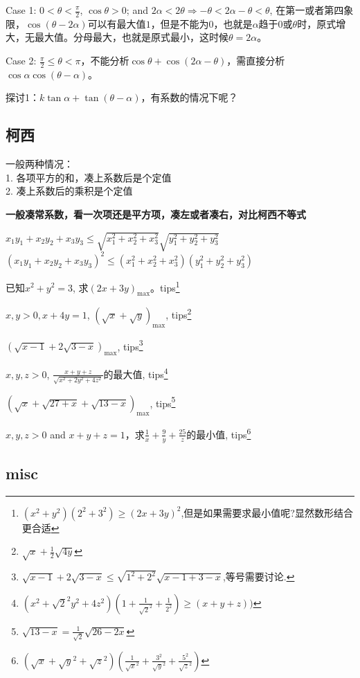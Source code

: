 \documentclass[algebra.tex]{subfiles}
\begin{document}
Case 1: $0<\theta < \frac{\pi}{2}$,\; $\cos\theta>0$; and $2\alpha < 2\theta \Rightarrow -\theta <2\alpha-\theta < \theta$, 在第一或者第四象限，$\cos(\theta-2\alpha)$可以有最大值$1$，但是不能为0，也就是$\alpha$趋于$0$或$\theta$时，原式增大，无最大值。分母最大，也就是原式最小，这时候$\theta=2\alpha$。

Case 2: $\frac{\pi}{2}\le \theta <\pi$，不能分析$\cos\theta+\cos(2\alpha-\theta)$，需直接分析$\cos\alpha\cos(\theta-\alpha)$。

探讨1：$k\tan\alpha+\tan(\theta-\alpha)$，有系数的情况下呢？

\subsection{柯西}
一般两种情况：\\
1. 各项平方的和，凑上系数后是个定值\\
2. 凑上系数后的乘积是个定值

\textbf{一般凑常系数，看一次项还是平方项，凑左或者凑右，对比柯西不等式}

$x_1y_1+x_2y_2+x_3y_3 \le \sqrt{x_1^2+x_2^2+x_3^2} \sqrt{y_1^2+y_2^2+y_3^2}$ \\
$(x_1y_1+x_2y_2+x_3y_3)^2 \le (x_1^2+x_2^2+x_3^2)(y_1^2+y_2^2+y_3^2)$

已知$x^2+y^2=3$, 求$(2x+3y)_{\text{max}}$。tips\footnote{$(x^2+y^2)(2^2+3^2) \ge (2x+3y)^2$,但是如果需要求最小值呢?显然数形结合更合适}

$x,y>0, x+4y=1$, $(\sqrt{x}+\sqrt{y})_{\text{max}}$, tips\footnote{$\sqrt{x}+\frac{1}{2}\sqrt{4y}$}

$(\sqrt{x-1} + 2\sqrt{3-x})_{\text{max}}$, tips\footnote{$\sqrt{x-1} + 2\sqrt{3-x} \le \sqrt{1^2+2^2}\sqrt{x-1+3-x}$,等号需要讨论.}

$x,y,z >0$, $\frac{x+y+z}{\sqrt{x^2+2y^2+4z^2}}$的最大值, tips\footnote{$(x^2+\sqrt{2}^2 y^2+4z^2)(1+\frac{1}{\sqrt{2}^2} +\frac{1}{2^{2}})\ge (x+y+z))$}


$(\sqrt{x}+\sqrt{27+x} +\sqrt{13-x})_{\text{max}}$, tips\footnote{$\sqrt{13-x} = \frac{1}{\sqrt{2}}\sqrt{26-2x}$}

$x,y,z>0$ and $x+y+z=1$，求$\frac{1}{x}+\frac{9}{y}+\frac{25}{z}$的最小值, tips\footnote{$(\sqrt{x}+\sqrt{y}^2+\sqrt{z}^2)(\frac{1}{\sqrt{x}^2}+\frac{3^2}{\sqrt{y}^2}+\frac{5^2}{\sqrt{z}^2})$}

\subsection{misc}
\end{document}

